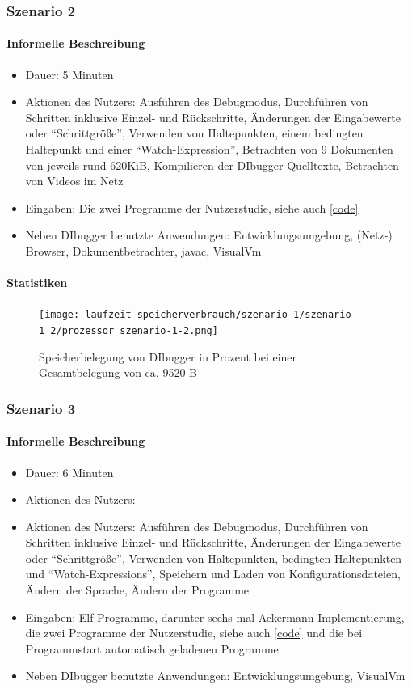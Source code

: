\documentclass[parskip=full]{scrartcl}
\begin{document}
    \subsubsection{Szenario 2}
        \paragraph{Informelle Beschreibung}
        \begin{itemize}
            \item{Dauer:} 5 Minuten 
            \item{Aktionen des Nutzers:} Ausführen des Debugmodus, Durchführen von Schritten inklusive Einzel- und Rückschritte, Änderungen der Eingabewerte oder \enquote{Schrittgröße}, Verwenden von Haltepunkten, einem bedingten Haltepunkt und einer \enquote{Watch-Expression}, Betrachten von 9 Dokumenten von jeweils rund 620KiB, Kompilieren der DIbugger-Quelltexte, Betrachten von Videos im Netz
            \item{Eingaben:} Die zwei Programme der Nutzerstudie, siehe auch \ref{code}
            \item{Neben DIbugger benutzte Anwendungen:} Entwicklungsumgebung, (Netz-) Browser, Dokumentbetrachter, javac, VisualVm  
        \end{itemize}
       \paragraph{Statistiken}
       \begin{figure}[!h]
            \centering
            \texttt{[image: laufzeit-speicherverbrauch/szenario-1/szenario-1\_2/prozessor\_szenario-1-2.png]}
            \caption{Speicherbelegung von DIbugger in Prozent bei einer Gesamtbelegung von ca. 9520 B}
       \end{figure}
    \subsubsection{Szenario 3}
        \paragraph{Informelle Beschreibung}
        \begin{itemize}
            \item{Dauer:} 6 Minuten 
            \item{Aktionen des Nutzers:}  
            \item{Aktionen des Nutzers:} Ausführen des Debugmodus, Durchführen von Schritten inklusive Einzel- und Rückschritte, Änderungen der Eingabewerte oder \enquote{Schrittgröße}, Verwenden von Haltepunkten, bedingten Haltepunkten und \enquote{Watch-Expressions}, Speichern und Laden von Konfigurationsdateien, Ändern der Sprache, Ändern der Programme
            \item{Eingaben:} Elf Programme, darunter sechs mal Ackermann-Implementierung, die zwei Programme der Nutzerstudie, siehe auch \ref{code} und die bei Programmstart automatisch geladenen Programme
            \item{Neben DIbugger benutzte Anwendungen:} Entwicklungsumgebung, VisualVm
        \end{itemize}
\end{document}
